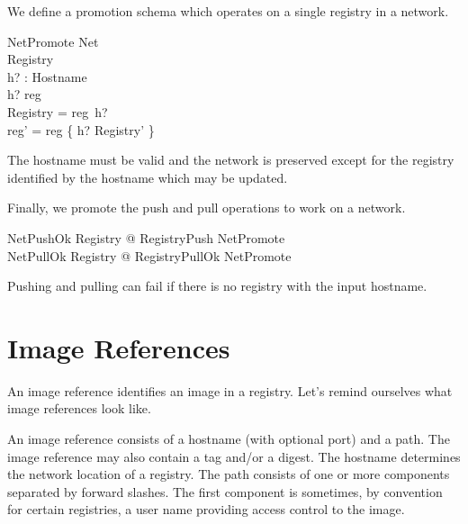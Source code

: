 \documentclass[a4paper,twoside,12pt]{article}
\begin{document}
\begin{samepage}
We define a promotion schema which operates on a single registry in a network.
\begin{schema}{NetPromote}
  \Delta Net \\
  \Delta Registry \\
  h? : Hostname \\
\where
  h? \in \dom reg \\
  \theta Registry = reg~h? \\
  reg' = reg \oplus \{ h? \mapsto \theta Registry' \} \\
\end{schema}
The hostname must be valid and the network is preserved except for the registry identified by the hostname which may be updated.
\end{samepage}

\begin{samepage}
Finally, we promote the push and pull operations to work on a network.
\begin{zed}
  NetPushOk  \exists \Delta Registry @ RegistryPush \land NetPromote \\
  NetPullOk  \exists \Delta Registry @ RegistryPullOk \land NetPromote
\end{zed}
Pushing and pulling can fail if there is no registry with the input hostname.
\end{samepage}

\newpage
\section{Image References}

An image reference identifies an image in a registry. Let's remind ourselves what image references look like.

An image reference consists of a hostname (with optional port) and a path. The image reference may also contain a tag and/or a digest. The hostname determines the network location of a registry. The path consists of one or more components separated by forward slashes. The first component is sometimes, by convention for certain registries, a user name providing access control to the image.
\end{document}
